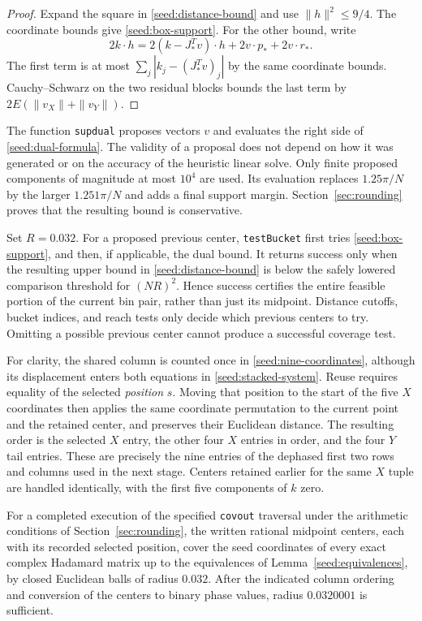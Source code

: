 \begin{proof}
Expand the square in \eqref{seed:distance-bound} and use
$\|h\|^2\le9/4$.  The coordinate bounds give
\eqref{seed:box-support}.  For the other bound, write
\[
 2k\cdot h
 =2(k-J_*^Tv)\cdot h+2v\cdot p_*+2v\cdot r_*.
\]
The first term is at most $\sum_j|k_j-(J_*^Tv)_j|$ by the same coordinate
bounds.  Cauchy--Schwarz on the two residual blocks bounds the last term
by $2E(\|v_X\|+\|v_Y\|)$.
\end{proof}

The function \texttt{supdual} proposes vectors $v$ and evaluates the right
side of \eqref{seed:dual-formula}.  The validity of a proposal does not
depend on how it was generated or on the accuracy of the heuristic linear
solve.  Only finite proposed components of magnitude at most $10^4$ are
used.  Its evaluation replaces $1.25\pi/N$ by the larger $1.251\pi/N$
and adds a final support margin.  Section~\ref{sec:rounding} proves that
the resulting bound is conservative.

Set $R=0.032$.  For a proposed previous center, \texttt{testBucket} first
tries \eqref{seed:box-support}, and then, if applicable, the dual bound.
It returns success only when the resulting upper bound in
\eqref{seed:distance-bound} is below the safely lowered comparison
threshold for $(NR)^2$.  Hence success certifies the entire feasible
portion of the current bin pair, rather than just its midpoint.
Distance cutoffs, bucket indices, and reach tests only decide which previous
centers to try.  Omitting a possible previous center cannot produce a
successful coverage test.

For clarity, the shared column is counted once in
\eqref{seed:nine-coordinates}, although its displacement enters both
equations in \eqref{seed:stacked-system}.  Reuse requires equality of the
selected \emph{position} $s$.  Moving that position to the start of the
five $X$ coordinates then applies the same coordinate permutation to the
current point and the retained center, and preserves their Euclidean
distance.  The resulting order is the selected $X$ entry, the other four
$X$ entries in order, and the four $Y$ tail entries.  These are precisely
the nine entries of the dephased first two rows and columns used in the
next stage.  Centers retained earlier for the same $X$ tuple are handled
identically, with the first five components of $k$ zero.

\begin{proposition}
\label{seed:cover}
For a completed execution of the specified \texttt{covout} traversal
under the arithmetic conditions of Section~\ref{sec:rounding}, the written
rational midpoint centers, each with its recorded selected position, cover
the seed coordinates of every exact complex Hadamard matrix up to the
equivalences of Lemma~\ref{seed:equivalences}, by closed Euclidean balls
of radius $0.032$.  After the indicated column ordering and conversion of
the centers to binary phase values, radius $0.0320001$ is sufficient.
\end{proposition}

